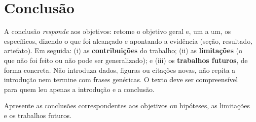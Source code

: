 \chapter{Conclusão}\label{sec:conclusao}

\begin{dica}
A conclusão \emph{responde} aos objetivos: retome o objetivo geral e, um a um, os
específicos, dizendo o que foi alcançado e apontando a evidência (seção, resultado,
artefato). Em seguida: (i) as \textbf{contribuições} do trabalho; (ii) as
\textbf{limitações} (o que não foi feito ou não pode ser generalizado); e (iii) os
\textbf{trabalhos futuros}, de forma concreta. Não introduza dados, figuras ou citações
novas, não repita a introdução nem termine com frases genéricas. O texto deve ser
compreensível para quem leu apenas a introdução e a conclusão.
\end{dica}

Apresente as conclusões correspondentes aos objetivos ou hipóteses, as limitações e
os trabalhos futuros.
